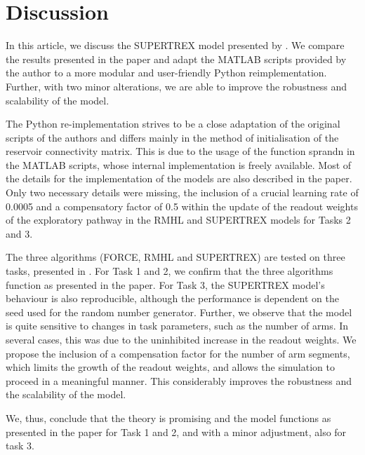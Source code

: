 \section{Discussion}

In this article, we discuss the SUPERTREX model presented by \textcite{pyle2019}. We compare the results presented in the paper and adapt the MATLAB scripts provided by the author to a more modular and user-friendly Python reimplementation. Further, with two minor alterations, we are able to improve the robustness and scalability of the model.

The Python re-implementation strives to be a close adaptation of the original scripts of the authors and  differs mainly in the method of initialisation of the reservoir connectivity matrix. This is due to the usage of the function sprandn in the MATLAB scripts, whose internal implementation is freely available. Most of the details for the implementation of the models are also described in the paper. Only two necessary  details were missing, the inclusion of a crucial learning rate of 0.0005 and a compensatory factor of 0.5 within the update of the readout weights of the exploratory pathway in the RMHL and SUPERTREX models for Tasks 2 and 3.

The three algorithms (FORCE, RMHL and SUPERTREX) are tested on three tasks, presented in \textcite{pyle2019}. For Task 1 and 2, we confirm that the three algorithms function as presented in the paper. For Task 3, the SUPERTREX model's behaviour is also reproducible, although the performance is dependent on the seed used for the random number generator. Further, we observe that the model is quite sensitive to changes in task parameters, such as the number of arms. In several cases, this was due to the uninhibited increase in the readout weights. We propose the inclusion of a compensation factor for the number of arm segments, which limits the growth of the readout weights, and allows the simulation to proceed in a meaningful manner. This considerably improves the robustness and the scalability of the model.

We, thus, conclude that the theory is promising and the model functions as presented in the paper for Task 1 and 2, and with a minor adjustment, also for task 3.



